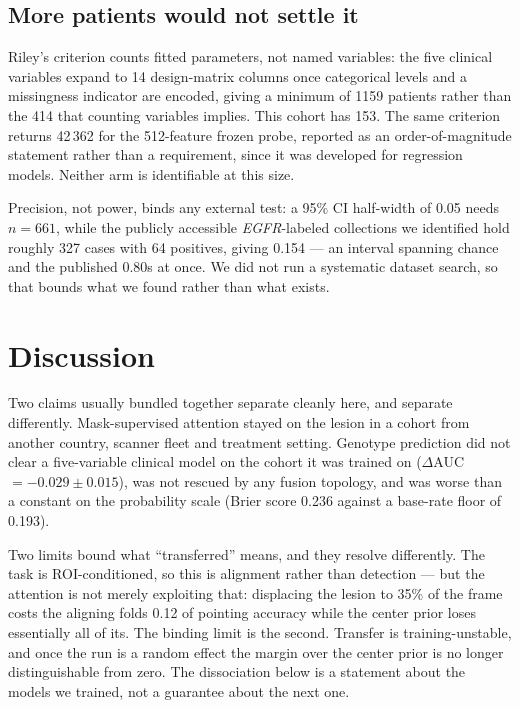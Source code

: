 \documentclass[11pt]{article}
\begin{document}
\subsection*{More patients would not settle it}

Riley's criterion \citep{riley2020} counts fitted parameters, not named variables:
the five clinical variables expand to 14 design-matrix columns once categorical
levels and a missingness indicator are encoded, giving a minimum of 1159 patients
rather than the 414 that counting variables implies. This cohort has 153. The same
criterion returns 42\,362 for the 512-feature frozen probe, reported as an
order-of-magnitude statement rather than a requirement, since it was developed for
regression models. Neither arm is identifiable at this size.

Precision, not power, binds any external test: a 95\% CI half-width of 0.05 needs
$n = 661$, while the publicly accessible \textit{EGFR}-labeled collections we
identified hold roughly 327 cases with 64 positives, giving 0.154 --- an interval
spanning chance and the published 0.80s at once. We did not run a systematic
dataset search, so that bounds what we found rather than what exists.

\section*{Discussion}

Two claims usually bundled together separate cleanly here, and separate
differently. Mask-supervised attention stayed on the lesion in a cohort from
another country, scanner fleet and treatment setting. Genotype prediction did not
clear a five-variable clinical model on the cohort it was trained on
($\Delta$AUC $= -0.029 \pm 0.015$), was not rescued by any fusion topology, and was
worse than a constant on the probability scale (Brier score 0.236 against a
base-rate floor of 0.193).

Two limits bound what ``transferred'' means, and they resolve differently. The
task is ROI-conditioned, so this is alignment rather than detection --- but the
attention is not merely exploiting that: displacing the lesion to 35\% of the
frame costs the aligning folds 0.12 of pointing accuracy while the center prior
loses essentially all of its. The binding limit is the second. Transfer is
training-unstable, and once the run is a random effect the margin over the center
prior is no longer distinguishable from zero. The dissociation below is a
statement about the models we trained, not a guarantee about the next one.
\end{document}
